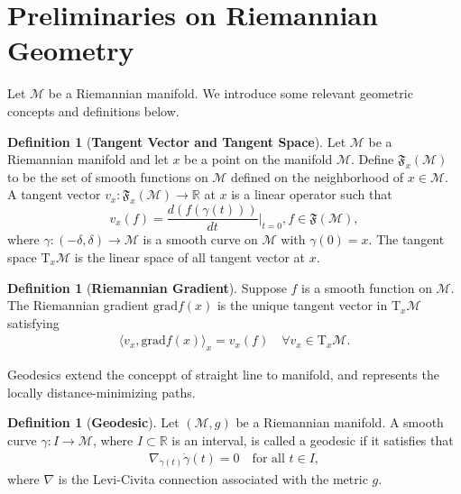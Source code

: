 \documentclass{article}
\theoremstyle{plain}
\theoremstyle{definition}
\newtheorem{definition}[theorem]{Definition}
\theoremstyle{remark}
\begin{document}
\label{author info}
\label{final author}




\newpage
\appendix
\onecolumn


\section{Preliminaries on Riemannian Geometry }\label{appendix:prelim}
Let $\mathcal{M}$ be a Riemannian manifold. We introduce some relevant geometric concepts and definitions below.
\begin{definition}[\bf Tangent Vector and Tangent Space]\label{def:tangent_space} 
Let $\mathcal{M}$ be a Riemannian manifold and let $x$ be a point on the manifold $\mathcal{M}$. Define $\mathfrak{F}_x(\mathcal{M})$ to be the set of smooth functions on $\mathcal{M}$ defined on the neighborhood of $x \in\mathcal{M}$. A tangent vector $v_x:\mathfrak{F}_x(\mathcal{M})\rightarrow\mathbb{R}$ at $x$ is a linear operator such that $$v_x(f)=\frac{d(f(\gamma(t)))}{dt}\biggr\rvert_{t=0}, f\in\mathfrak{F}(\mathcal{M}),$$where $\gamma:(-\delta,\delta)\rightarrow\mathcal{M}$ is a smooth curve on $\mathcal{M}$ with $\gamma(0)=x$. The tangent space $\mathrm{T}_x\mathcal{M}$ is the linear space of all tangent vector at $x$.
\end{definition}

\begin{definition}[\bf Riemannian Gradient]\label{def:riemannian_gradient} 
Suppose $f$ is a smooth function on $\mathcal{M}$. The Riemannian gradient $\mathrm{grad} f(x)$ is the unique tangent vector in $\mathrm{T}_x \mathcal{M}$ satisfying
\begin{align*}
\langle v_x, \mathrm{grad} f(x) \rangle_x = v_x(f)\quad\forall v_x \in \mathrm{T}_x \mathcal{M}.
\end{align*}
\end{definition}

Geodesics extend the conceppt of straight line to manifold, and represents the locally distance-minimizing paths.

\begin{definition}[\bf Geodesic]\label{def:geodesic} 
Let $ (\mathcal{M}, g) $ be a Riemannian manifold. A smooth curve $ \gamma: I \to \mathcal{M} $, where $ I \subset \mathbb{R} $ is an interval, is called a geodesic if it satisfies that
\begin{align*}
\nabla_{\dot{\gamma}(t)} \dot{\gamma}(t) = 0 \quad \text{for all } t \in I,
\end{align*}
where $ \nabla $ is the Levi-Civita connection associated with the metric $ g $.
\end{definition}
\end{document}
